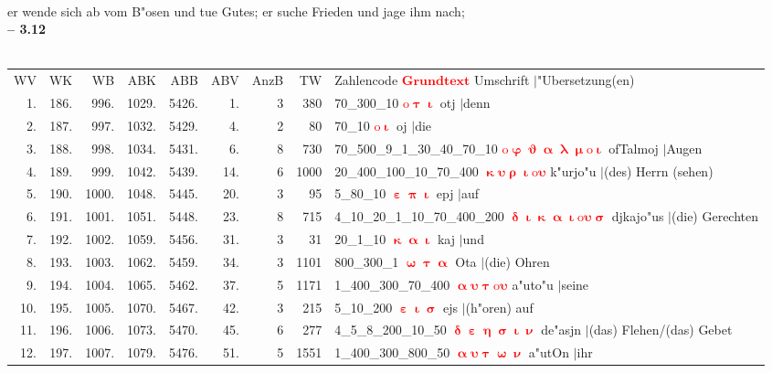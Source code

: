 \documentclass[a4paper,10pt,landscape]{article}
\begin{document}
\\
er wende sich ab vom B"osen und tue Gutes; er suche Frieden und jage ihm nach;\\
\newpage 
{\bf -- 3.12}\\
\medskip \\
\begin{tabular}{rrrrrrrrp{120mm}}
WV&WK&WB&ABK&ABB&ABV&AnzB&TW&Zahlencode \textcolor{red}{$\boldsymbol{Grundtext}$} Umschrift $|$"Ubersetzung(en)\\
1.&186.&996.&1029.&5426.&1.&3&380&70\_300\_10 \textcolor{red}{$\boldsymbol{\mathrm{o}\uptau\upiota}$} otj $|$denn\\
2.&187.&997.&1032.&5429.&4.&2&80&70\_10 \textcolor{red}{$\boldsymbol{\mathrm{o}\upiota}$} oj $|$die\\
3.&188.&998.&1034.&5431.&6.&8&730&70\_500\_9\_1\_30\_40\_70\_10 \textcolor{red}{$\boldsymbol{\mathrm{o}\upvarphi\upvartheta\upalpha\uplambda\upmu\mathrm{o}\upiota}$} ofTalmoj $|$Augen\\
4.&189.&999.&1042.&5439.&14.&6&1000&20\_400\_100\_10\_70\_400 \textcolor{red}{$\boldsymbol{\upkappa\upsilon\uprho\upiota\mathrm{o}\upsilon}$} k"urjo"u $|$(des) Herrn (sehen)\\
5.&190.&1000.&1048.&5445.&20.&3&95&5\_80\_10 \textcolor{red}{$\boldsymbol{\upepsilon\uppi\upiota}$} epj $|$auf\\
6.&191.&1001.&1051.&5448.&23.&8&715&4\_10\_20\_1\_10\_70\_400\_200 \textcolor{red}{$\boldsymbol{\updelta\upiota\upkappa\upalpha\upiota\mathrm{o}\upsilon\upsigma}$} djkajo"us $|$(die) Gerechten\\
7.&192.&1002.&1059.&5456.&31.&3&31&20\_1\_10 \textcolor{red}{$\boldsymbol{\upkappa\upalpha\upiota}$} kaj $|$und\\
8.&193.&1003.&1062.&5459.&34.&3&1101&800\_300\_1 \textcolor{red}{$\boldsymbol{\upomega\uptau\upalpha}$} Ota $|$(die) Ohren\\
9.&194.&1004.&1065.&5462.&37.&5&1171&1\_400\_300\_70\_400 \textcolor{red}{$\boldsymbol{\upalpha\upsilon\uptau\mathrm{o}\upsilon}$} a"uto"u $|$seine\\
10.&195.&1005.&1070.&5467.&42.&3&215&5\_10\_200 \textcolor{red}{$\boldsymbol{\upepsilon\upiota\upsigma}$} ejs $|$(h"oren) auf\\
11.&196.&1006.&1073.&5470.&45.&6&277&4\_5\_8\_200\_10\_50 \textcolor{red}{$\boldsymbol{\updelta\upepsilon\upeta\upsigma\upiota\upnu}$} de"asjn $|$(das) Flehen/(das) Gebet\\
12.&197.&1007.&1079.&5476.&51.&5&1551&1\_400\_300\_800\_50 \textcolor{red}{$\boldsymbol{\upalpha\upsilon\uptau\upomega\upnu}$} a"utOn $|$ihr\\

\end{tabular}
\end{document}
